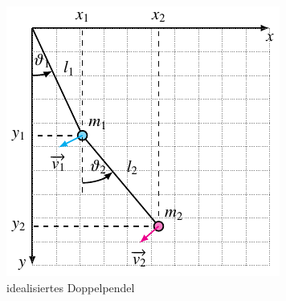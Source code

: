 \begin{figure}
    \centering
    \includegraphics{papers/doppelpendel/images/pendel_pic.pdf}
    \caption{idealisiertes Doppelpendel}
    \label{fig:pendulum}
\end{figure}

